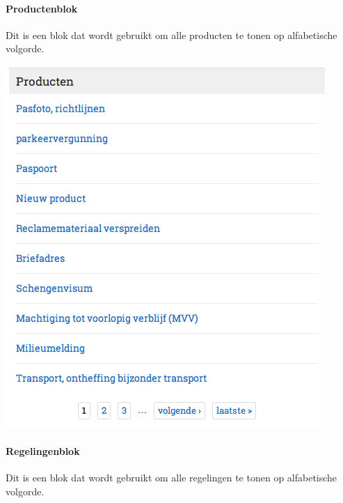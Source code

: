 \paragraph{Productenblok}

Dit is een blok dat wordt gebruikt om alle producten te tonen op alfabetische volgorde.

\begin{center}
	\includegraphics[scale=0.5]{img/blokken/producten.png}
\end{center}

\paragraph{Regelingenblok}

Dit is een blok dat wordt gebruikt om alle regelingen te tonen op alfabetische volgorde.

